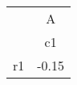 \begin{tabular}{l*{1}{c}}
\hline\hline
            &           A\\
            &          c1\\
\hline
r1          &       -0.15\\
\hline\hline
\end{tabular}
